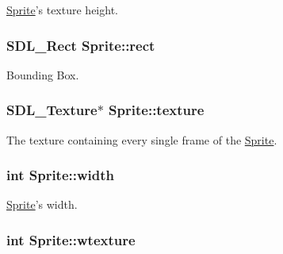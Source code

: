 \hyperlink{class_sprite}{Sprite}'s texture height. 

\hypertarget{class_sprite_ab8ae1fcc8b8fb328583438cf1f0b6e2f}{
\subsubsection[{rect}]{\setlength{\rightskip}{0pt plus 5cm}S\-D\-L\-\_\-\-Rect Sprite\-::rect\hspace{0.3cm}{\ttfamily [protected]}}}\label{class_sprite_ab8ae1fcc8b8fb328583438cf1f0b6e2f}


Bounding Box. 

\hypertarget{class_sprite_a531ed274733d916261f49e1a2cbb6ba9}{
\subsubsection[{texture}]{\setlength{\rightskip}{0pt plus 5cm}S\-D\-L\-\_\-\-Texture$\ast$ Sprite\-::texture\hspace{0.3cm}{\ttfamily [protected]}}}\label{class_sprite_a531ed274733d916261f49e1a2cbb6ba9}


The texture containing every single frame of the \hyperlink{class_sprite}{Sprite}. 

\hypertarget{class_sprite_a0a3364944c5e361fc9e7ae406224d682}{
\subsubsection[{width}]{\setlength{\rightskip}{0pt plus 5cm}int Sprite\-::width\hspace{0.3cm}{\ttfamily [protected]}}}\label{class_sprite_a0a3364944c5e361fc9e7ae406224d682}


\hyperlink{class_sprite}{Sprite}'s width. 

\hypertarget{class_sprite_a342df27bc7e10f79c0bc4d89689e5bfe}{
\subsubsection[{wtexture}]{\setlength{\rightskip}{0pt plus 5cm}int Sprite\-::wtexture\hspace{0.3cm}{\ttfamily [protected]}}}\label{class_sprite_a342df27bc7e10f79c0bc4d89689e5bfe}


